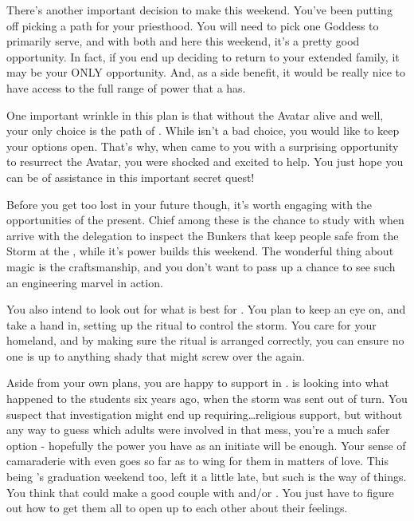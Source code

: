 \documentclass[char]{GL2020}
\begin{document}
There's another important decision to make this weekend. You've been putting off picking a path for your priesthood. You will need to pick one Goddess to primarily serve, and with both \cEbbPriest{} and \cFlowPriest{} here this weekend, it's a pretty good opportunity. In fact, if you end up deciding to return to your extended family, it may be your ONLY opportunity. And, as a side benefit, it would be really nice to have access to the full range of power that a \cInitiate{\cleric} has.

One important wrinkle in this plan is that without the \cEbb{} Avatar alive and well, your only choice is the path of \cFlow{}. While \cFlow{} isn’t a bad choice, you would like to keep your options open. That’s why, when \cFlowPriest{} came to you with a surprising opportunity to resurrect the Avatar, you were shocked and excited to help. You just hope you can be of assistance in this important secret quest!

Before you get too lost in your future though, it's worth engaging with the opportunities of the present. Chief among these  is the chance to study with \cBunker{} when \cBunker{\they} arrive with the \pShip{} delegation to inspect the Bunkers that keep people safe from the Storm at the \pSc{}, while it's power builds this weekend. The wonderful thing about \pShippies{} magic is the craftsmanship, and you don’t want to pass up a chance to see such an engineering marvel in action.

You also intend to look out for what is best for \pShip{}. You plan to keep an eye on, and take a hand in, setting up the ritual to control the storm. You care for your homeland, and by making sure the ritual is arranged correctly, you can ensure no one is up to anything shady that might screw over the \pShippies{} again.

Aside from your own plans, you are happy to support \cPresident{} in \cPresident{\theirs}. \cPresident{} is looking into what happened to the students six years ago, when the storm was sent out of turn. You suspect that investigation might end up requiring\ldots religious support, but without any way to guess which adults were involved in that mess, you're a much safer option - hopefully the power you have as an initiate will be enough. Your sense of camaraderie with \cPresident{} even goes so far as to wing\cInitiate{\person} for them in matters of love. This being \cPresident{}'s graduation weekend too, \cPresident{\they} \cPresident{\have} left it a little late, but such is the way of things. You think that \cPresident{} could make a good couple with \cHeir{} and/or \cChupStudent{}. You just have to figure out how to get them all to open up to each other about their feelings.
\end{document}
